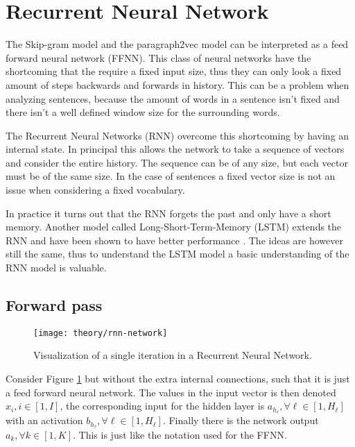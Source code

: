 
\section{Recurrent Neural Network}

The Skip-gram model and the paragraph2vec model can be interpreted as a feed forward neural network (FFNN). This class of neural networks have the shortcoming that the require a fixed input size, thus they can only look a fixed amount of steps backwards and forwards in history. This can be a problem when analyzing sentences, because the amount of words in a sentence isn't fixed and there isn't a well defined window size for the surrounding words.

The Recurrent Neural Networks (RNN) overcome this shortcoming by having an internal state. In principal this allows the network to take a sequence of vectors and consider the entire history. The sequence can be of any size, but each vector must be of the same size. In the case of sentences a fixed vector size is not an issue when considering a fixed vocabulary.

In practice it turns out that the RNN forgets the past and only have a short memory. Another model called Long-Short-Term-Memory (LSTM) extends the RNN and have been shown to have better performance \cite{alexgraves}. The ideas are however still the same, thus to understand the LSTM model a basic understanding of the RNN model is valuable.

\subsection{Forward pass}

\begin{figure}[h]
	\centering
	\texttt{[image: theory/rnn-network]}
	\caption{Visualization of a single iteration in a Recurrent Neural Network.}
	\label{fig:theory:rnn:rnn-network}
\end{figure}

Consider Figure \ref{fig:theory:rnn:rnn-network} but without the extra internal connections, such that it is just a feed forward neural network. The values in the input vector is then denoted $x_{i}, i \in [1, I]$, the corresponding input for the hidden layer is $a_{h_\ell}, \forall \ell \in [1, H_\ell]$ with an activation $b_{h_\ell}, \forall \ell \in [1, H_\ell]$. Finally there is the network output $a_{k}, \forall k \in [1, K]$. This is just like the notation used for the FFNN.

